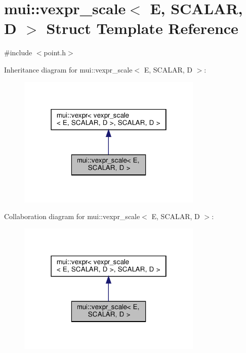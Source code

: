 \hypertarget{structmui_1_1vexpr__scale}{}\section{mui\+:\+:vexpr\+\_\+scale$<$ E, S\+C\+A\+L\+AR, D $>$ Struct Template Reference}
\label{structmui_1_1vexpr__scale}


{\ttfamily \#include $<$point.\+h$>$}



Inheritance diagram for mui\+:\+:vexpr\+\_\+scale$<$ E, S\+C\+A\+L\+AR, D $>$\+:
\nopagebreak
\begin{figure}[H]
\begin{center}
\leavevmode
\includegraphics[width=250pt]{structmui_1_1vexpr__scale__inherit__graph}
\end{center}
\end{figure}


Collaboration diagram for mui\+:\+:vexpr\+\_\+scale$<$ E, S\+C\+A\+L\+AR, D $>$\+:
\nopagebreak
\begin{figure}[H]
\begin{center}
\leavevmode
\includegraphics[width=250pt]{structmui_1_1vexpr__scale__coll__graph}
\end{center}
\end{figure}
